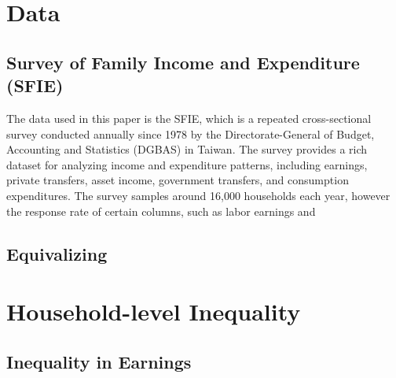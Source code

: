 \documentclass{article}
\begin{document}
\section{Data}
\label{sec:data}

\subsection{Survey of Family Income and Expenditure (SFIE)}
The data used in this paper is the SFIE, which is a repeated cross-sectional survey conducted annually since 1978 by the Directorate-General of Budget, Accounting and Statistics (DGBAS) in Taiwan.
The survey provides a rich dataset for analyzing income and expenditure patterns, including earnings, private transfers, asset income, government transfers, and consumption expenditures.
The survey samples around 16,000 households each year, however the response rate of certain columns, such as labor earnings and  

\subsection{Equivalizing}


\section{Household-level Inequality}
\label{sec:household_inequality}

\subsection{Inequality in Earnings}
\end{document}
